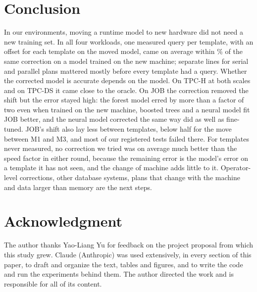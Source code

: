 \documentclass[conference]{IEEEtran}
\begin{document}
\section{Conclusion}
\label{sec:conclusion}
In our environments, moving a runtime model to new hardware did not need a
new training set. In all four workloads, one measured query per template,
with an offset for each template on the moved model, came on average within
\XeMoveMaxPct\% of the same correction on a model trained on the new
machine; separate lines for serial and parallel plans mattered mostly
before every template had a query. Whether the corrected model is accurate
depends on the model. On TPC-H at both scales and on TPC-DS it came close
to the oracle. On JOB the correction removed the shift but the error
stayed high: the forest model erred by more than a factor of two even when
trained on the new machine, boosted trees and a neural model fit JOB
better, and the neural model corrected the same way did as well as
fine-tuned. JOB's shift also lay less between templates, below half for
the move between M1 and M3, and most of our registered tests failed there.
For templates never measured, no correction we tried was on average much
better than the speed factor in either round, because the remaining error
is the model's error on a template it has not seen, and the change of
machine adds little to it. Operator-level corrections, other database
systems, plans that change with the machine and data larger than memory
are the next steps.

\section*{Acknowledgment}
The author thanks Yao-Liang Yu for feedback on the project proposal from
which this study grew.
Claude (Anthropic) was used extensively, in every section of this paper, to
draft and organize the text, tables and figures, and to write the code and
run the experiments behind them. The author directed the work and is
responsible for all of its content.



\end{document}
